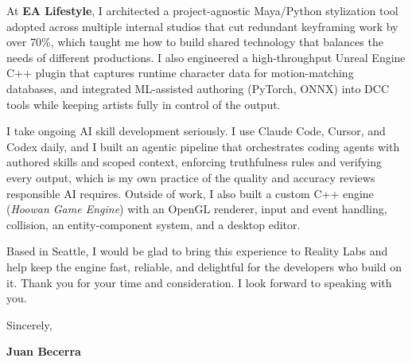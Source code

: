 \documentclass[letterpaper,11pt]{article}
\begin{document}
At \textbf{EA Lifestyle}, I architected a project-agnostic Maya/Python stylization tool adopted across multiple
internal studios that cut redundant keyframing work by over 70\%, which taught me how to build shared technology
that balances the needs of different productions. I also engineered a high-throughput Unreal Engine C++ plugin
that captures runtime character data for motion-matching databases, and integrated ML-assisted authoring
(PyTorch, ONNX) into DCC tools while keeping artists fully in control of the output.

I take ongoing AI skill development seriously. I use Claude Code, Cursor, and Codex daily, and I built an
agentic pipeline that orchestrates coding agents with authored skills and scoped context, enforcing
truthfulness rules and verifying every output, which is my own practice of the quality and accuracy reviews
responsible AI requires. Outside of work, I also built a custom C++ engine (\emph{Hoowan Game Engine}) with an
OpenGL renderer, input and event handling, collision, an entity-component system, and a desktop editor.

Based in Seattle, I would be glad to bring this experience to Reality Labs and help keep the engine fast,
reliable, and delightful for the developers who build on it. Thank you for your time and consideration. I look
forward to speaking with you.

\vspace{10pt}
\noindent Sincerely,

\vspace{14pt}
\noindent \textbf{Juan Becerra}
\end{document}
